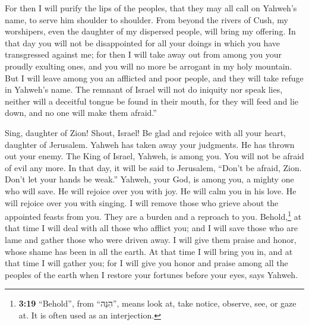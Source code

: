  For then I will purify the lips of the peoples, that they
may all call on Yahweh's name, to serve him shoulder to shoulder.
 From beyond the rivers of Cush, my worshipers, even the
daughter of my dispersed people, will bring my offering. 
In that day you will not be disappointed for all your doings in which
you have transgressed against me; for then I will take away out from
among you your proudly exulting ones, and you will no more be arrogant
in my holy mountain.  But I will leave among you an
afflicted and poor people, and they will take refuge in Yahweh's name.
 The remnant of Israel will not do iniquity nor speak
lies, neither will a deceitful tongue be found in their mouth, for they
will feed and lie down, and no one will make them afraid.''

 Sing, daughter of Zion! Shout, Israel! Be glad and
rejoice with all your heart, daughter of Jerusalem. 
Yahweh has taken away your judgments. He has thrown out your enemy. The
King of Israel, Yahweh, is among you. You will not be afraid of evil any
more.  In that day, it will be said to Jerusalem, ``Don't
be afraid, Zion. Don't let your hands be weak.''  Yahweh,
your God, is among you, a mighty one who will save. He will rejoice over
you with joy. He will calm you in his love. He will rejoice over you
with singing.  I will remove those who grieve about the
appointed feasts from you. They are a burden and a reproach to you.
 Behold,\footnote{\textbf{3:19} ``Behold'', from
  ``הִנֵּה'', means look at, take notice, observe, see, or gaze at. It
  is often used as an interjection.} at that time I will deal with all
those who afflict you; and I will save those who are lame and gather
those who were driven away. I will give them praise and honor, whose
shame has been in all the earth.  At that time I will
bring you in, and at that time I will gather you; for I will give you
honor and praise among all the peoples of the earth when I restore your
fortunes before your eyes, says Yahweh.
